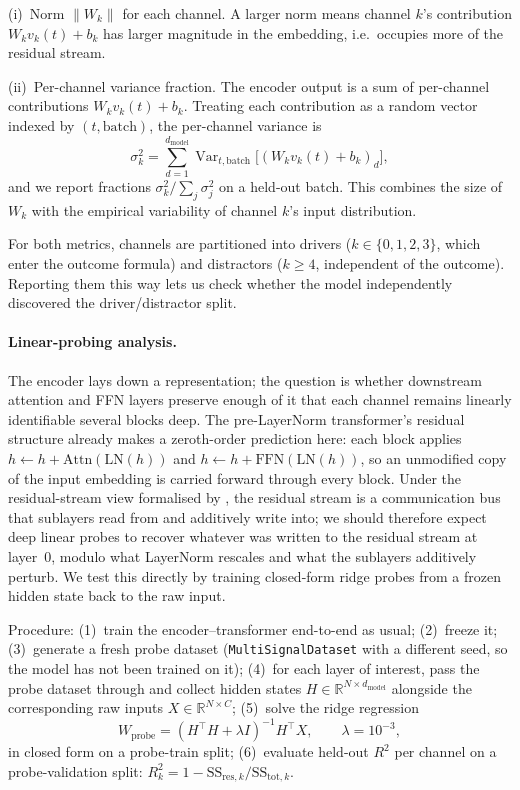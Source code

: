\documentclass[11pt]{article}
\begin{document}
(i)~Norm $\|W_k\|$ for each channel. A larger norm means channel $k$'s
contribution $W_k v_k(t) + b_k$ has larger magnitude in the embedding,
i.e.\ occupies more of the residual stream.

(ii)~Per-channel variance fraction. The encoder output is a sum of
per-channel contributions $W_k v_k(t) + b_k$. Treating each
contribution as a random vector indexed by $(t, \text{batch})$, the
per-channel variance is
\[
\sigma^2_k = \sum_{d=1}^{d_{\text{model}}}
             \operatorname{Var}_{t,\text{batch}}\!\big[(W_k v_k(t) + b_k)_d\big],
\]
and we report fractions $\sigma^2_k / \sum_j \sigma^2_j$ on a held-out
batch. This combines the size of $W_k$ with the empirical variability
of channel $k$'s input distribution.

For both metrics, channels are partitioned into drivers ($k \in
\{0,1,2,3\}$, which enter the outcome formula) and distractors
($k \ge 4$, independent of the outcome). Reporting them this way lets
us check whether the model independently discovered the
driver/distractor split.

\paragraph{Linear-probing analysis.}
The encoder lays down a representation; the question is whether
downstream attention and FFN layers preserve enough of it that
each channel remains linearly identifiable several blocks deep.
The pre-LayerNorm transformer's residual structure already makes
a zeroth-order prediction here: each block applies $h \leftarrow
h + \text{Attn}(\text{LN}(h))$ and $h \leftarrow h +
\text{FFN}(\text{LN}(h))$, so an unmodified copy of the input
embedding is carried forward through every block. Under the
residual-stream view formalised by \citet{elhage2021framework},
the residual stream is a communication bus that sublayers read
from and additively write into; we should therefore expect deep
linear probes \citep{alain2017probes} to recover whatever was
written to the residual stream at layer~$0$, modulo what LayerNorm
rescales and what the sublayers additively perturb. We test this
directly by training closed-form ridge probes from a frozen hidden
state back to the raw input.

Procedure: (1)~train the encoder--transformer end-to-end as usual;
(2)~freeze it; (3)~generate a fresh probe dataset
(\texttt{MultiSignalDataset} with a different seed, so the model has
not been trained on it); (4)~for each layer of interest, pass the
probe dataset through and collect hidden states
$H \in \mathbb{R}^{N \times d_{\text{model}}}$ alongside the
corresponding raw inputs $X \in \mathbb{R}^{N \times C}$; (5)~solve
the ridge regression
\[
W_{\text{probe}} = (H^\top H + \lambda I)^{-1} H^\top X,
\qquad \lambda = 10^{-3},
\]
in closed form on a probe-train split; (6)~evaluate held-out
$R^2$ per channel on a probe-validation split:
$R^2_k = 1 - \mathrm{SS}_{\text{res},k} / \mathrm{SS}_{\text{tot},k}$.
\end{document}
